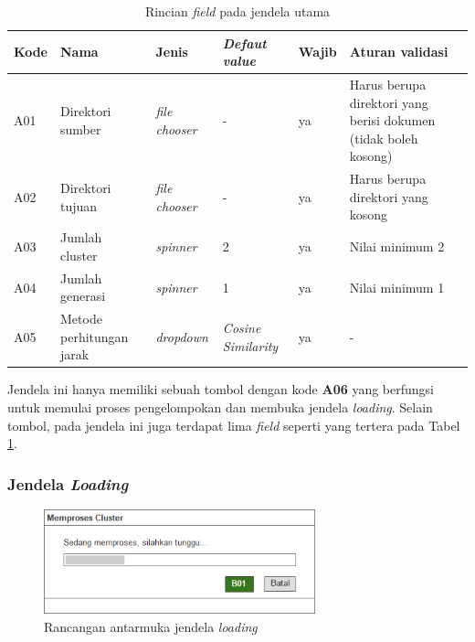 \documentclass[a4paper,twoside]{article}
\begin{document}
\begin{enumerate}
\begin{table}[h]
	\label{tbl:fieldUtama}
	\renewcommand{\arraystretch}{2}
	\begin{tabularx}{\textwidth}{l X l X l X} \hline
		\textbf{Kode} & \textbf{Nama} & \textbf{Jenis} & \textbf{\textit{Defaut value}} & \textbf{Wajib} & \textbf{Aturan validasi} \\ \hline
		A01 & Direktori sumber & \textit{file chooser} & - & ya & Harus berupa direktori yang berisi dokumen (tidak boleh kosong) \\ \hline
		A02 & Direktori tujuan & \textit{file chooser} & - & ya & Harus berupa direktori yang kosong \\ \hline
		A03 & Jumlah cluster & \textit{spinner} & 2 & ya & Nilai minimum 2 \\ \hline
		A04 & Jumlah generasi & \textit{spinner} & 1 & ya & Nilai minimum 1 \\ \hline
		A05 & Metode perhitungan jarak & \textit{dropdown} & \textit{Cosine Similarity} & ya & - \\ \hline
	\end{tabularx}
	\caption{Rincian \textit{field} pada jendela utama}
\end{table}

Jendela ini hanya memiliki sebuah tombol dengan kode \textbf{A06} yang berfungsi untuk memulai proses pengelompokan dan membuka jendela \textit{loading}. Selain tombol, pada jendela ini juga terdapat lima \textit{field} seperti yang tertera pada Tabel \ref{tbl:fieldUtama}.

\subsubsection*{Jendela \textit{Loading}}

\begin{figure}[h]
	\begin{center}
		\includegraphics[width=0.7\textwidth]{UI/LoadingPage}
		\caption{Rancangan antarmuka jendela \textit{loading}}
		\label{fig:UILoading}
	\end{center}
\end{figure}


\end{enumerate}
\end{document}
